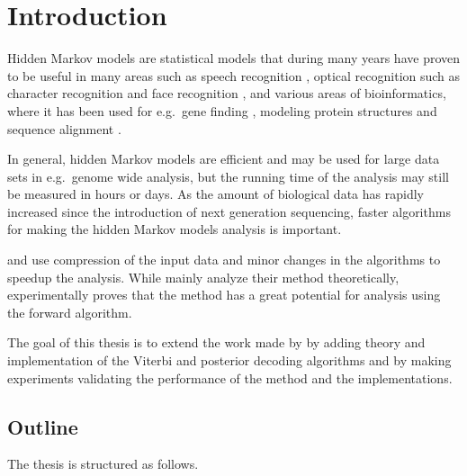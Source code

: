 \chapter{Introduction}

Hidden Markov models are statistical models that during many years have proven
to be useful in many areas such as speech recognition
\citep{rabiner1989tutorial}, optical recognition such as character recognition
\citep{agazzi1993hidden} and face recognition \citep{nefian1998hidden}, and
various areas of bioinformatics, where it has been used for e.g.\ gene finding
\citep{burge1997prediction}, modeling protein structures and sequence alignment
\citep{eddy1998profile}.

In general, hidden Markov models are efficient and may be used for large data
sets in e.g.\ genome wide analysis, but the running time of the analysis may
still be measured in hours or days. As the amount of biological data has
rapidly increased since the introduction of next generation sequencing, faster
algorithms for making the hidden Markov models analysis is important.

\citet{lifshits2009speeding} and \citet{sand2013ziphmmlib} use compression of
the input data and minor changes in the algorithms to speedup the
analysis. While \citet{lifshits2009speeding} mainly analyze their method
theoretically, \citet{sand2013ziphmmlib} experimentally proves that the method
has a great potential for analysis using the forward algorithm.

The goal of this thesis is to extend the work made by \citet{sand2013ziphmmlib}
by adding theory and implementation of the Viterbi and posterior decoding
algorithms and by making experiments validating the performance of the method
and the implementations.

\section{Outline}

The thesis is structured as follows.

